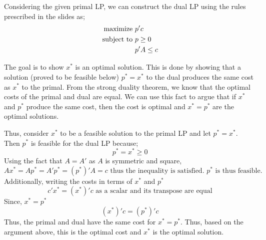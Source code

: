 Considering the given primal LP, we can construct the dual LP using the rules prescribed in the slides as; \\

\begin{align}
    \text{maximize } &p'c \notag\\
    \text{subject to } &p \ge 0 \notag\\
                    &p'A \le c \notag
\end{align}

The goal is to show $x^*$ is an optimal solution. This is done by showing that a solution (proved to be feasible below) $p^* = x^*$ to the dual produces the same cost as $x^*$ to the primal. From the strong duality theorem, we know that the optimal costs of the primal and dual are equal. We can use this fact to argue that if $x^*$ and $p^*$ produce the same cost, then the cost is optimal and $x^* = p^*$ are the optimal solutions.

Thus, consider $x^*$ to be a feasible solution to the primal LP and let $p^* = x^*$. \\
Then $p^*$ is feasible for the dual LP because;
\[ p^* = x^* \ge 0\]
Using the fact that $A = A'$ as $A$ is symmetric and square, 
\[Ax^* = Ap^* = A'p^* = (p^*)'A = c \text{ thus the inequality is satisfied. } p^* \text{ is thus feasible. }\]
Additionally, writing the costs in terms of $x^*$ and $p^*$
\[c'x^* = (x^*)'c \text{ as a scalar and its transpose are equal}\]
Since, $x^* = p^*$
\[(x^*)'c = (p^*)'c\]
Thus, the primal and dual have the same cost for $x^* = p^*$. Thus, based on the argument above, this is the optimal cost and $x^*$ is the optimal solution.


